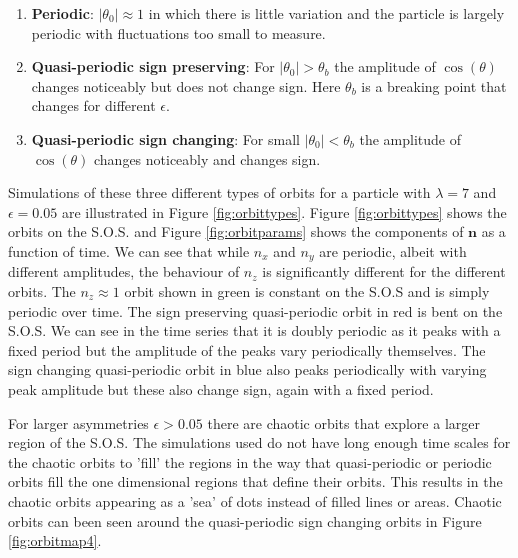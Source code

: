 \begin{enumerate}
\item \textbf{Periodic}: $\left|\theta_0\right| \approx 1$ in which there is little variation and the particle is largely periodic with fluctuations too small to measure.
\item \textbf{Quasi-periodic sign preserving}: For $\left|\theta_0\right|> \theta_b$ the amplitude of $\cos(\theta)$ changes noticeably but does not change sign. Here $\theta_b$ is a breaking point that changes for different $\epsilon$.
\item \textbf{Quasi-periodic sign changing}: For small $\left|\theta_0\right| < \theta_b$ the amplitude of $\cos(\theta)$ changes noticeably and changes sign. 
\end{enumerate}

Simulations of these three different types of orbits for a particle with $\lambda=7$ and $\epsilon=0.05$ are illustrated in Figure \ref{fig:orbittypes}. Figure \ref{fig:orbittypes} shows the orbits on the S.O.S. and Figure \ref{fig:orbitparams} shows the components of $\mathbf{n}$ as a function of time. We can see that while $n_x$ and $n_y$ are periodic, albeit with different amplitudes, the  behaviour of $n_z$ is significantly different for the different orbits. The $n_z \approx 1$  orbit shown in green is constant on the S.O.S and is simply periodic over time. The sign preserving quasi-periodic orbit in red is bent on the S.O.S. We can see in the time series that it is doubly periodic as it peaks with a fixed period but the amplitude of the peaks vary periodically themselves. The sign changing quasi-periodic orbit in blue also peaks periodically with varying peak amplitude but these also change sign, again with a fixed period.


For larger asymmetries $\epsilon > 0.05$ there are chaotic orbits that explore a larger region of the S.O.S. The simulations used do not have long enough time scales for the chaotic orbits to 'fill' the regions in the way that quasi-periodic or periodic orbits fill the one dimensional regions that define their orbits. This results in the chaotic orbits appearing as a 'sea' of dots instead of filled lines or areas. Chaotic orbits can been seen around the quasi-periodic sign changing orbits in Figure \ref{fig:orbitmap4}.

